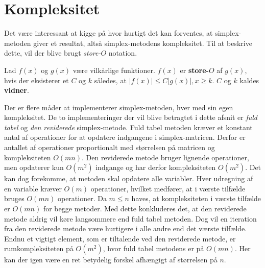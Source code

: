 \section{Kompleksitet}
\label{kompleksitet}
Det være interessant at kigge på hvor hurtigt det kan forventes, at simplex-metoden giver et resultat, altså simplex-metodens kompleksitet.
Til at beskrive dette, vil der blive brugt \textit{store-$O$} notation.
%
\begin{defn}{}{}
Lad $f(x)$ og $g(x)$ være vilkårlige funktioner. $f(x)$ er \textbf{store-$O$} af $g(x)$, hvis der eksisterer et $C$ og $k$ således, at $|f(x)| \leq C|g(x)|, x \geq k$. $C$ og $k$ kaldes \textbf{vidner}.
\end{defn}\noindent
%
Der er flere måder at implementerer simplex-metoden, hver med sin egen kompleksitet.
De to implementeringer der vil blive betragtet i dette afsnit er \textit{fuld tabel} og \textit{den reviderede} simplex-metode.
%
Fuld tabel metoden kræver et konstant antal af operationer for at opdatere indgangene i simplex-matricen.
Derfor er antallet af operationer proportionalt med størrelsen på matricen og kompleksiteten $O(mn)$.
Den reviderede metode bruger lignende operationer, men opdaterer kun $O(m^2)$ indgange og har derfor kompleksiteten $O(m^2)$.
Det kan dog forekomme, at metoden skal opdatere alle variabler.
Hver udregning af en variable kræver $O(m)$ operationer, hvilket medfører, at i værste tilfælde bruges $O(mn)$ operationer.
Da $m \leq n$ haves, at kompleksiteten i værste tilfælde er $O(mn)$ for begge metoder.
Med dette konkluderes det, at den reviderede metode aldrig vil køre langsommere end fuld tabel metoden.
Dog vil en iteration fra den reviderede metode være hurtigere i alle andre end det værste tilfælde.
Endnu et vigtigt element, som er tiltalende ved den reviderede metode, er rumkompleksiteten på $O(m^2)$, hvor fuld tabel metodens er på $O(mn)$.
Her kan der igen være en ret betydelig forskel afhængigt af størrelsen på $n$.